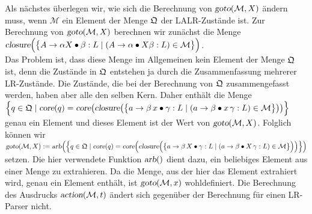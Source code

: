 Als n\"achstes \"uberlegen wir, wie sich die Berechnung von $\textsl{goto}(\mathcal{M},X)$
\"andern muss, wenn $\mathcal{M}$ ein Element der Menge $\frak{Q}$ der LALR-Zust\"ande ist.  
Zur Berechnung von $\textsl{goto}(\mathcal{M},X)$ berechnen wir zun\"achst die Menge
\\[0.2cm]
\hspace*{1.3cm}
$\textsl{closure}\Bigl( \bigl\{  
  A \rightarrow \alpha X \bullet \beta:L \mid (A \rightarrow \alpha \bullet X \beta:L) \in \mathcal{M} 
  \bigr\} \Bigr)
$.
\\[0.2cm]
Das Problem ist, dass diese Menge im Allgemeinen kein Element der Menge $\frak{Q}$ ist,
denn die Zust\"ande in $\frak{Q}$ entstehen ja durch die Zusammenfassung mehrerer LR-Zust\"ande.
Die Zust\"ande, die bei der Berechnung von $\frak{Q}$ zusammengefasst werden, haben aber alle den selben
Kern.  Daher enth\"alt die  Menge
\\[0.2cm]
\hspace*{1.3cm}
$\Bigl\{ q \in \frak{Q} \mid \textsl{core}(q) =
  \textsl{core}\bigl(\textsl{closure}\bigl( \bigl\{  
  a \rightarrow \beta\, x \bullet \gamma:L \mid (a \rightarrow \beta \bullet x\, \gamma:L) \in \mathcal{M} 
  \bigr\} \bigr)\bigr)
  \Bigr\}
$
\\[0.2cm]
genau ein Element und dieses Element ist der Wert von $\textsl{goto}(\mathcal{M}, X)$.  Folglich
k\"onnen wir  
\\[0.2cm]
\hspace*{1.3cm}
$\displaystyle\textsl{goto}(\mathcal{M}, X) := \textsl{arb}\Bigl(\Bigl\{ q \in \frak{Q} \mid \textsl{core}(q) =
  \textsl{core}\Bigl(\textsl{closure}\Bigl( \bigl\{  
  a \rightarrow \beta\, X \bullet \gamma:L \mid (a \rightarrow \beta \bullet X\, \gamma:L) \in \mathcal{M} 
  \bigr\} \Bigr)\Bigr)
  \Bigr\} \Bigr)
$
\\[0.2cm]
setzen.  Die hier verwendete Funktion $\textsl{arb}()$ dient dazu, ein beliebiges Element aus einer Menge
zu extrahieren.  Da die Menge, aus der hier das Element extrahiert wird, genau ein Element enth\"alt, ist
$\textsl{goto}(\mathcal{M}, x)$ wohldefiniert.
Die Berechnung des Ausdrucks $\textsl{action}(\mathcal{M}, t)$ \"andert sich gegen\"uber der Berechnung f\"ur
einen LR-Parser nicht. 

